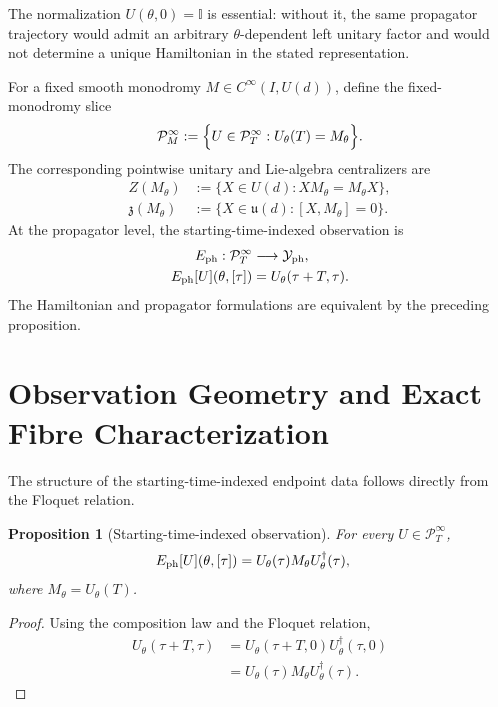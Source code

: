 \documentclass[twocolumn,prl,aps,floatfix]{revtex4-2}
\newtheorem{proposition}{Proposition}
\begin{document}
The normalization $U(\theta,0)=\mathbb I$ is essential: without it, the same propagator trajectory would admit an arbitrary $\theta$-dependent left unitary factor and would not determine a unique Hamiltonian in the stated representation.

For a fixed smooth monodromy $M\in C^\infty(I,U(d))$, define the fixed-monodromy slice
\begin{align}
\mathcal P_M^\infty
:=
\Bigl\{
U\in\mathcal P_T^\infty:
U_\theta(T)=M_\theta
\Bigr\}.
\end{align}
The corresponding pointwise unitary and Lie-algebra centralizers are
\begin{align}
Z(M_\theta)
&:=
\{X\in U(d):XM_\theta=M_\theta X\},
\\
\mathfrak z(M_\theta)
&:=
\{X\in\mathfrak u(d):[X,M_\theta]=0\}.
\end{align}
At the propagator level, the starting-time-indexed observation is
\begin{align}
E_{\rm ph}:\mathcal P_T^\infty
&\longrightarrow
\mathcal Y_{\rm ph},
\nonumber\\
E_{\rm ph}[U](\theta,[\tau])
&=
U_\theta(\tau+T,\tau).
\label{eq:Eph_prop}
\end{align}
The Hamiltonian and propagator formulations are equivalent by the preceding proposition.

\section{Observation Geometry and Exact Fibre Characterization}

The structure of the starting-time-indexed endpoint data follows directly from the Floquet relation.

\begin{proposition}[Starting-time-indexed observation]
For every $U\in\mathcal P_T^\infty$,
\begin{align}
E_{\rm ph}[U](\theta,[\tau])
&=
U_\theta(\tau)M_\theta U_\theta^\dagger(\tau),
\label{eq:orbit_observation}
\end{align}
where $M_\theta=U_\theta(T)$.
\end{proposition}

\begin{proof}
Using the composition law and the Floquet relation,
\begin{align}
U_\theta(\tau+T,\tau)
&=
U_\theta(\tau+T,0)
U_\theta^\dagger(\tau,0)
\nonumber\\
&=
U_\theta(\tau)M_\theta
U_\theta^\dagger(\tau).
\end{align}
\end{proof}
\end{document}
